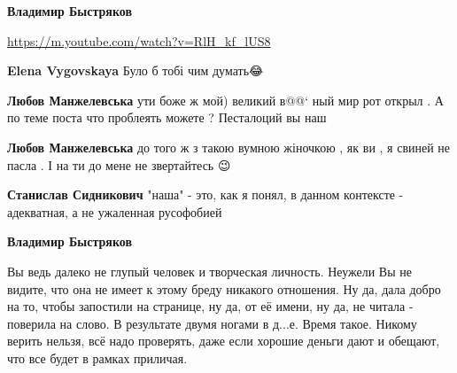 \begin{itemize}
\begin{itemize}
\textbf{Владимир Быстряков} 

\url{https://m.youtube.com/watch?v=RlH_kf_lUS8}

 
\textbf{Elena Vygovskaya} Було б тобі чим думать😂

 
\textbf{Любов Манжелевська} ути боже ж мой) великий в@@‘ ный мир рот открыл . А
по теме поста что проблеять можете ? Песталоций вы наш

 
\textbf{Любов Манжелевська} до того ж з такою вумною жіночкою , як ви , я свиней не пасла . І на ти до мене не звертайтесь 😉

 
\textbf{Станислав Сидникович} "наша" - это, как я понял, в данном контексте - адекватная, а не ужаленная русофобией

 
\textbf{Владимир Быстряков} 

Вы ведь далеко не глупый человек и творческая личность. Неужели Вы не видите,
что она не имеет к этому бреду никакого отношения. Ну да, дала добро на то,
чтобы запостили на странице, ну да, от её имени, ну да, не читала - поверила на
слово. В результате двумя ногами в д...е. Время такое. Никому верить нельзя,
всё надо проверять, даже если хорошие деньги дают и обещают, что все будет в
рамках приличая. 


\end{itemize}
\end{itemize}
